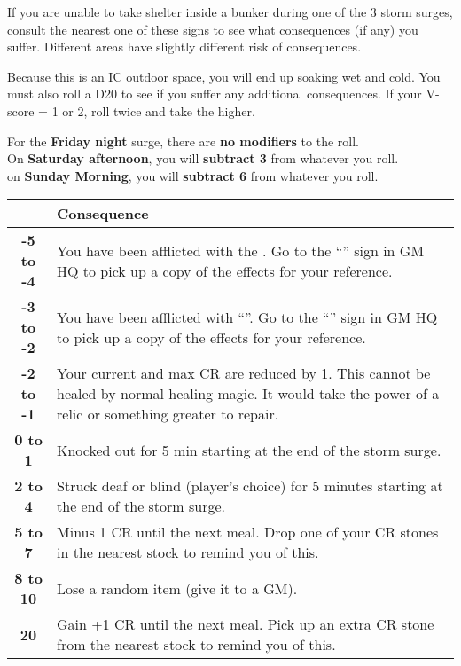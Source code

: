 \documentclass[green]{GL2020}
\begin{document}
\name{\gStormSurgeOutside{}}

If you are unable to take shelter inside a bunker during one of the 3 storm surges, consult the nearest one of these signs to see what consequences (if any) you suffer. Different areas have slightly different risk of consequences.

Because this is an IC outdoor space, you will end up soaking wet and cold. You must also roll a D20 to see if you suffer any additional consequences. If your V-score = 1 or 2, roll twice and take the higher.

{\large For the \textbf{Friday night} surge, there are \textbf{no modifiers} to the roll.}\\
{\large On \textbf{Saturday afternoon}, you will \textbf{subtract 3} from whatever you roll.}\\
{\large on \textbf{Sunday Morning}, you will \textbf{subtract 6} from whatever you roll.}\\

\begin{tabularx}{\textwidth}{|>{\centering\arraybackslash}c | >{\centering\arraybackslash}X |}
\hline
  {\large Your Total} & {\large Consequence}  \\
\hline
 \textbf{-5 to -4} &  You have been afflicted with the \iSlowActingPoison{}. Go to the ``\sStormSurgeConsequences{}'' sign in GM HQ to pick up a copy of the effects for your reference. \\
\hline
 \textbf{-3 to -2} & You have been afflicted with ``\gBadLuckCurse{}''. Go to the ``\sStormSurgeConsequences{}'' sign in GM HQ to pick up a copy of the effects for your reference. \\
\hline
 \textbf{-2 to -1} & Your current and max CR are reduced by 1. This cannot be healed by normal healing magic. It would take the power of a relic or something greater to repair.  \\
\hline
 \textbf{0 to 1} & Knocked out for 5 min starting at the end of the storm surge.  \\
\hline
  \textbf{2 to 4} & Struck deaf or blind (player’s choice) for 5 minutes starting at the end of the storm surge.  \\
\hline
  \textbf{5 to 7} & Minus 1 CR until the next meal. Drop one of your CR stones in the nearest stock to remind you of this.  \\
\hline
  \textbf{8 to 10} & Lose a random item (give it to a GM).  \\
\hline
 \textbf{20} & Gain +1 CR until the next meal. Pick up an extra CR stone from the nearest stock to remind you of this.  \\
\hline
\end{tabularx}
\end{document}

